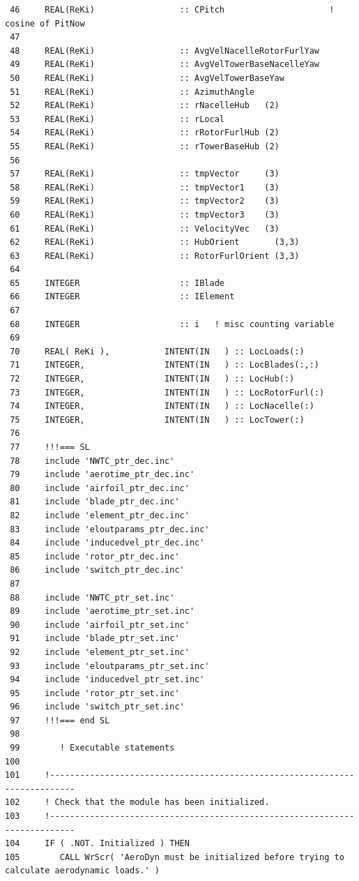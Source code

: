 \documentclass[11pt]{article}
\begin{document}
{\begin{verbatim}
 46     REAL(ReKi)                 :: CPitch                     ! cosine of PitNow
 47  
 48     REAL(ReKi)                 :: AvgVelNacelleRotorFurlYaw
 49     REAL(ReKi)                 :: AvgVelTowerBaseNacelleYaw
 50     REAL(ReKi)                 :: AvgVelTowerBaseYaw
 51     REAL(ReKi)                 :: AzimuthAngle
 52     REAL(ReKi)                 :: rNacelleHub   (2)
 53     REAL(ReKi)                 :: rLocal
 54     REAL(ReKi)                 :: rRotorFurlHub (2)
 55     REAL(ReKi)                 :: rTowerBaseHub (2)
 56     
 57     REAL(ReKi)                 :: tmpVector     (3)
 58     REAL(ReKi)                 :: tmpVector1    (3)
 59     REAL(ReKi)                 :: tmpVector2    (3)
 60     REAL(ReKi)                 :: tmpVector3    (3)
 61     REAL(ReKi)                 :: VelocityVec   (3)
 62     REAL(ReKi)                 :: HubOrient       (3,3)
 63     REAL(ReKi)                 :: RotorFurlOrient (3,3)
 64  
 65     INTEGER                    :: IBlade
 66     INTEGER                    :: IElement
 67  
 68     INTEGER                    :: i   ! misc counting variable
 69  
 70     REAL( ReKi ),           INTENT(IN   ) :: LocLoads(:)
 71     INTEGER,                INTENT(IN   ) :: LocBlades(:,:)
 72     INTEGER,                INTENT(IN   ) :: LocHub(:)
 73     INTEGER,                INTENT(IN   ) :: LocRotorFurl(:)
 74     INTEGER,                INTENT(IN   ) :: LocNacelle(:)
 75     INTEGER,                INTENT(IN   ) :: LocTower(:)
 76  
 77     !!!=== SL
 78     include 'NWTC_ptr_dec.inc'
 79     include 'aerotime_ptr_dec.inc'
 80     include 'airfoil_ptr_dec.inc'
 81     include 'blade_ptr_dec.inc'
 82     include 'element_ptr_dec.inc'
 83     include 'eloutparams_ptr_dec.inc'
 84     include 'inducedvel_ptr_dec.inc'
 85     include 'rotor_ptr_dec.inc'
 86     include 'switch_ptr_dec.inc'
 87  
 88     include 'NWTC_ptr_set.inc'
 89     include 'aerotime_ptr_set.inc'
 90     include 'airfoil_ptr_set.inc'
 91     include 'blade_ptr_set.inc'
 92     include 'element_ptr_set.inc'
 93     include 'eloutparams_ptr_set.inc'
 94     include 'inducedvel_ptr_set.inc'
 95     include 'rotor_ptr_set.inc'
 96     include 'switch_ptr_set.inc'
 97     !!!=== end SL
 98  
 99        ! Executable statements
100  
101     !---------------------------------------------------------------------------
102     ! Check that the module has been initialized.
103     !---------------------------------------------------------------------------
104     IF ( .NOT. Initialized ) THEN
105        CALL WrScr( 'AeroDyn must be initialized before trying to calculate aerodynamic loads.' )

\end{verbatim}}
\end{document}
